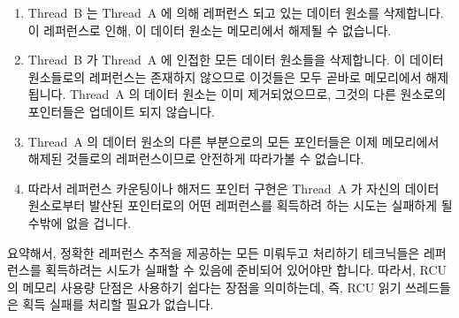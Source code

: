 \begin{enumerate}
\item	Thread~B 는 Thread~A 에 의해 레퍼런스 되고 있는 데이터 원소를
	삭제합니다.
	이 레퍼런스로 인해, 이 데이터 원소는 메모리에서 해제될 수 없습니다.
\item	Thread~B 가 Thread~A 에 인접한 모든 데이터 원소들을 삭제합니다.
	이 데이터 원소들로의 레퍼런스는 존재하지 않으므로 이것들은 모두 곧바로
	메모리에서 해제됩니다.
	Thread~A 의 데이터 원소는 이미 제거되었으므로, 그것의 다른 원소로의
	포인터들은 업데이트 되지 않습니다.
\item	Thread~A 의 데이터 원소의 다른 부분으로의 모든 포인터들은 이제
	메모리에서 해제된 것들로의 레퍼런스이므로 안전하게 따라가볼 수
	없습니다.
\item	따라서 레퍼런스 카운팅이나 해저드 포인터 구현은 Thread~A 가 자신의
	데이터 원소로부터 발산된 포인터로의 어떤 레퍼런스를 획득하려 하는
	시도는 실패하게 될 수밖에 없을 겁니다.
\iffalse

\item	Thread~B removes the data element referenced by Thread~A.
	Because of this reference, the data element cannot yet be freed.
\item	Thread~B removes all the data elements adjacent to the one
	referenced by Thread~A.
	Because there are no references held for these data elements,
	they are all immediately freed.
	Because Thread~A's data element has already been removed,
	its outgoing pointers are not updated.
\item	All of Thread~A's data element's outgoing pointers now reference
	the freelist, and therefore cannot safely be traversed.
\item	The reference-counting or hazard-pointer implementation therefore
	has no choice but to fail any attempt by Thread~A to acquire
	a reference via any of the pointers emanating from its data
	element.
\fi
\end{enumerate}

요약해서, 정확한 레퍼런스 추적을 제공하는 모든 미뤄두고 처리하기 테크닉들은
레퍼런스를 획득하려는 시도가 실패할 수 있음에 준비되어 있어야만 합니다.
따라서, RCU 의 메모리 사용량 단점은 사용하기 쉽다는 장점을 의미하는데, 즉, RCU
읽기 쓰레드들은 획득 실패를 처리할 필요가 없습니다.
\iffalse

In short, any defered-processing technique that offers precise tracking
of references must also be prepared to fail attempts to acquire references.
Therefore, RCU's memory-footprint disadvantage implies an ease-of-use
advantage, namely that RCU readers need not deal with acquisition failure.
\fi

